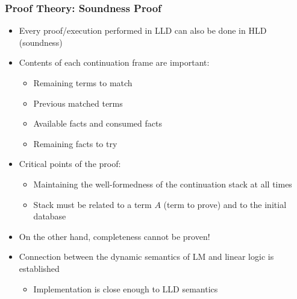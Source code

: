 \begin{frame}[fragile]
   \frametitle{Proof Theory: Soundness Proof}
   \begin{itemize}
      \item Every proof/execution performed in LLD can also be done in HLD (soundness)
      \item Contents of each continuation frame are important:
      \begin{itemize}
         \item Remaining terms to match
         \item Previous matched terms
         \item Available facts and consumed facts
         \item Remaining facts to try
      \end{itemize}
      \item Critical points of the proof:
      \begin{itemize}
         \item Maintaining the well-formedness of the continuation stack at all times
         \item Stack must be related to a term $A$ (term to prove) and to the initial database
      \end{itemize}
      \item On the other hand, completeness cannot be proven!
      \item Connection between the dynamic semantics of LM and linear logic is established
      \begin{itemize}
         \item Implementation is close enough to LLD semantics
      \end{itemize}
   \end{itemize}
\end{frame}
